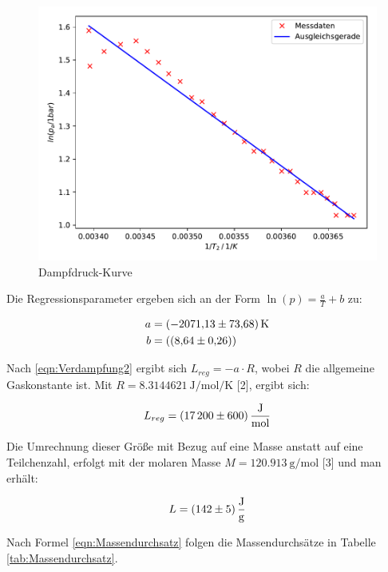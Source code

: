 \begin{figure}
  \centering
  \includegraphics[scale=0.8]{content/plot2.pdf}
  \caption{Dampfdruck-Kurve}
  \label{fig:plot2}
\end{figure}

Die Regressionsparameter ergeben sich an der Form $\ln({p}) = \frac{a}{T} +b$ 
zu:

\begin{align*}
a &= \SI{-2071.13+-73.68}{\kelvin}\\
b &= (\SI{8.64+-0.26}{})
\end{align*}

Nach \eqref{eqn:Verdampfung2} ergibt sich $L_{reg} = -a \cdot R$, wobei $R$ die allgemeine 
Gaskonstante ist. Mit $R = \SI{8.3144621}{\joule\per\mol\per\kelvin}$ [2], 
ergibt sich:

\begin{equation*}
L_{reg} = \SI{17200+-600}{\joule\per\mol}
\end{equation*}

Die Umrechnung dieser Größe mit Bezug auf eine Masse anstatt auf eine
Teilchenzahl, erfolgt mit der molaren Masse $M = \SI{120.913}{\gram\per\mol}$ [3]
und man erhält:

\begin{equation*}
L = \SI{142+-5}{\joule\per\gram}
\end{equation*}

Nach Formel \eqref{eqn:Massendurchsatz} folgen die Massendurchsätze in 
Tabelle \ref{tab:Massendurchsatz}. 

